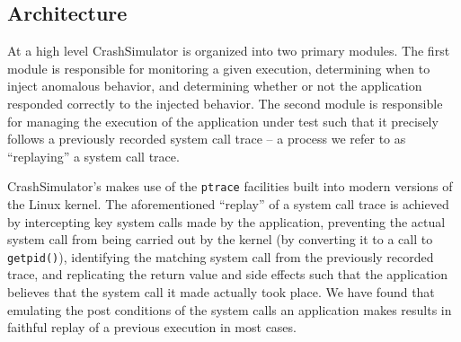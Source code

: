 
    \subsection{Architecture}
        
    At a high level CrashSimulator is organized into two primary modules. The
    first module is responsible for monitoring a given execution, determining
    when to inject anomalous behavior, and determining whether or not the
    application responded correctly to the injected behavior. The second module
    is responsible for managing the execution of the application under test such
    that it precisely follows a previously recorded system call trace -- a
    process we refer to as ``replaying'' a system call trace.

        
    CrashSimulator's makes use of the {\tt ptrace} facilities built into modern
    versions of the Linux kernel. The aforementioned ``replay'' of a system call
    trace is achieved by intercepting key system calls made by the application,
    preventing the actual system call from being carried out by the kernel (by
    converting it to a call to {\tt getpid()}), identifying the matching system
    call from the previously recorded trace, and replicating the return value
    and side effects such that the application believes that the system call it
    made actually took place. We have found that emulating the post conditions
    of the system calls an application makes results in faithful replay of a
    previous execution in most cases.

